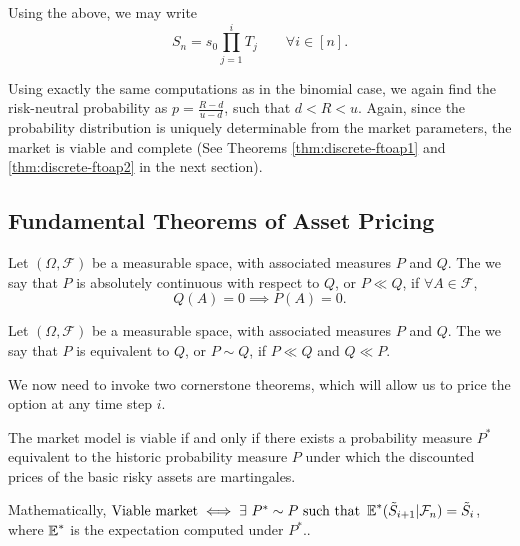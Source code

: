 Using the above, we may write
\begin{equation}
	\label{eq:discrete-risky-prod-iid}
	S_n = s_0 \prod_{j=1}^{i} T_j  \qquad  \forall i \in [n] .
\end{equation}


Using exactly the same computations as in the binomial case, we again find the risk-neutral probability as $ p = \frac{R - d}{u - d} $, such that $ d < R < u $. Again, since the probability distribution is uniquely determinable from the market parameters, the market is viable and complete (See Theorems \ref{thm:discrete-ftoap1} and \ref{thm:discrete-ftoap2} in the next section).



\subsection{Fundamental Theorems of Asset Pricing}


\begin{dfn}
	Let $ (\Omega, \mathcal{F}) $ be a measurable space, with associated measures $ P $ and $ Q $. The we say that $ P $ is absolutely continuous with respect to $ Q $, or $ P \ll Q $, if $ \forall A \in \mathcal{F} $,
	\begin{equation*}
		Q(A) = 0 \implies P(A) = 0 .
	\end{equation*}
\end{dfn}

\begin{dfn}
	Let $ (\Omega, \mathcal{F}) $ be a measurable space, with associated measures $ P $ and $ Q $. The we say that $ P $ is equivalent to $ Q $, or $ P \sim Q $, if $ P \ll Q $ and $ Q \ll P $.
\end{dfn}


We now need to invoke two cornerstone theorems, which will allow us to price the option at any time step $ i $.

\begin{thm}
	\label{thm:discrete-ftoap1}
	The market model is viable if and only if there exists a probability measure $ P^* $ equivalent to the historic probability measure $ P $ under which the discounted prices of the basic risky assets are martingales.
	
	Mathematically,
	$ \text{Viable market} \iff \exists \  P^* \sim P \text{ such that } \operatorname{\mathbb{E}}^*( \tilde{S}_{i+1} | \mathcal{F}_n ) = \tilde{S}_{i} $, where $ \operatorname{\mathbb{E}}^* $ is the expectation computed under $ P^* $..
\end{thm}

